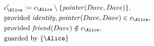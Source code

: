 \begin{align*}
&
c'_
{
\Alice
}
 := 
c_
{
\Alice
}
 \setminus 
\{
\mathit{\detokenize{
pointer
}}
(
Dave
,
Dave
)
\}
,\\
&
\text{provided } 
\mathit{\detokenize{
identity
}}
,
\mathit{\detokenize{
pointer
}}
(
Dave
,
Dave
)
 \in c_
{
\Alice
}
,\\
&
\text{provided } 
\mathit{\detokenize{
friend
}}
(
Dave
)
 \notin c_
{
\Alice
}
,\\
&
\text{guarded by } \{
\Alice
\}
\end{align*}
